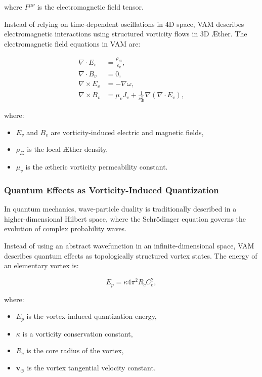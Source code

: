     where \( F^{\mu\nu} \) is the electromagnetic field tensor.

    Instead of relying on time-dependent oscillations in 4D space, VAM describes electromagnetic interactions using structured vorticity flows in 3D Æther. The electromagnetic field equations in VAM are:

    \begin{align}
        \nabla \cdot E_v &= \frac{\rho_\text{Æ}}{\varepsilon_v}, \\
        \nabla \cdot B_v &= 0, \\
        \nabla \times E_v &= -\nabla \omega, \\
        \nabla \times B_v &= \mu_v J_v + \frac{1}{\nu^2_\text{Æ}} \nabla(\nabla \cdot E_v),
    \end{align}

    where:
    \begin{itemize}
        \item \( E_v \) and \( B_v \) are vorticity-induced electric and magnetic fields,
        \item \( \rho_\text{Æ} \) is the local Æther density,
        \item \( \mu_v \) is the ætheric vorticity permeability constant.
    \end{itemize}

    \subsubsection*{Quantum Effects as Vorticity-Induced Quantization}

    In quantum mechanics, wave-particle duality is traditionally described in a higher-dimensional Hilbert space, where the Schrödinger equation governs the evolution of complex probability waves.

    Instead of using an abstract wavefunction in an infinite-dimensional space, VAM describes quantum effects as topologically structured vortex states. The energy of an elementary vortex is:

    \begin{equation*}
        E_p = \kappa 4\pi^2 R_c C^2_e,
    \end{equation*}

    where:
    \begin{itemize}
        \item \( E_p \) is the vortex-induced quantization energy,
        \item \( \kappa \) is a vorticity conservation constant,
        \item \( R_c \) is the core radius of the vortex,
        \item \( \mathbf{v}_{\scriptscriptstyle\boldsymbol{\circlearrowleft}} \) is the vortex tangential velocity constant.
    \end{itemize}

